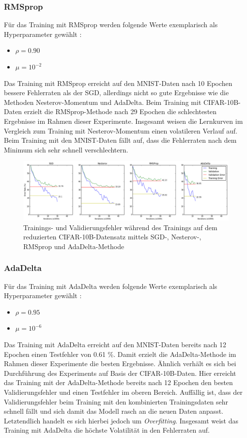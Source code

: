 \subsubsection{RMSprop}
Für das Training mit RMSprop werden folgende Werte exemplarisch als Hyperparameter gewählt \cite[vgl.][]{Dauphin2015}:
\begin{itemize}
\item $\rho = 0.90$
\item $\mu =10^{-2}$
\end{itemize}
Das Training mit RMSprop erreicht auf den MNIST-Daten nach 10 Epochen bessere Fehlerraten als der SGD, allerdings nicht so gute Ergebnisse wie die Methoden Nesterov-Momentum und AdaDelta.
Beim Training mit CIFAR-10B-Daten erzielt die RMSprop-Methode nach 29 Epochen die schlechtesten Ergebnisse im Rahmen dieser Experimente. Insgesamt weisen die Lernkurven im Vergleich zum Training mit Nesterov-Momentum einen volatileren Verlauf auf. Beim Training mit den MNIST-Daten fällt auf, dass die Fehlerraten nach dem Minimum sich sehr schnell verschlechtern.

\begin{figure}
\centering
\includegraphics[width=1.0\linewidth]{images/6_training_cifar_2}
\caption[]{Trainings- und Validierungsfehler während des Trainings auf dem reduzierten CIFAR-10B-Datensatz mittels SGD-, Nesterov-, RMSprop und AdaDelta-Methode}
\label{fig:6_training_cifar}
\end{figure}

\subsubsection{AdaDelta}
Für das Training mit AdaDelta werden folgende Werte exemplarisch als Hyperparameter gewählt \cite[vgl.][]{Zeiler2012}:
\begin{itemize}
\item $\rho = 0.95$
\item $\mu = 10^{-6}$
\end{itemize}
Das Training mit AdaDelta erreicht auf den MNIST-Daten bereits nach 12 Epochen einen Testfehler von 0.61 \%. Damit erzielt die AdaDelta-Methode im Rahmen dieser Experimente die besten Ergebnisse. Ähnlich verhält es sich bei Durchführung des Experiments auf Basis der CIFAR-10B-Daten. Hier erreicht das Training mit der AdaDelta-Methode bereits nach 12 Epochen den besten Validierungsfehler und einen Testfehler im oberen Bereich. Auffällig ist, dass der Validierungsfehler beim Training mit den kombinierten Trainingsdaten sehr schnell fällt und sich damit das Modell rasch an die neuen Daten anpasst. Letztendlich handelt es sich hierbei jedoch um \textit{Overfitting}. Insgesamt weist das Training mit AdaDelta die höchste Volatilität in den Fehlerraten auf.


